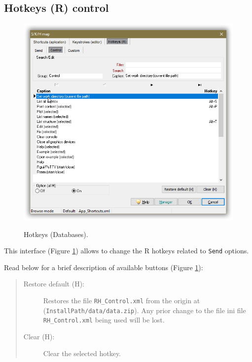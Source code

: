 \subsection{Hotkeys (R) control}

\begin{figure}[H]
  \includegraphics[scale=0.35]{./res/skh_map_rh_control_dlg.png}\\
  \caption{Hotkeys (Databases).}
  \label{fig:rh_control_dlg}
\end{figure}

This interface
(Figure \ref{fig:rh_control_dlg})
allows to change the R hotkeys related to \texttt{Send} options.

Read below for a brief description of available buttons (Figure \ref{fig:rh_control_dlg}):

\begin{quote}
  \begin{footnotesize}
    \begin{description}
      \item[Restore default (H):]
        Restores the file \texttt{RH\_Control.xml} from the origin at
        (\texttt{InstallPath/data/data.zip}). Any prior change to the file ini file
        \texttt{RH\_Control.xml} being used will be lost.
      \item[Clear (H):]
        Clear the selected hotkey.
    \end{description}
  \end{footnotesize}
\end{quote}


